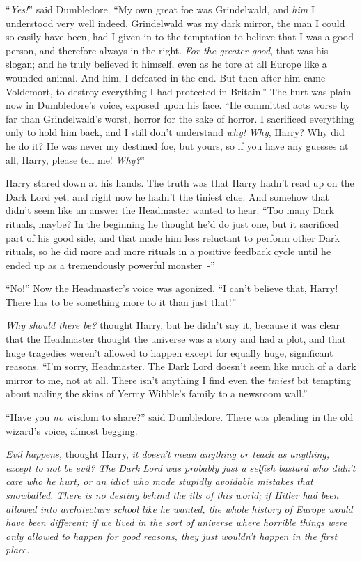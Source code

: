 ``\emph{Yes!}'' said Dumbledore. ``My own great foe was Grindelwald, and \emph{him} I understood very well indeed. Grindelwald was my dark mirror, the man I could so easily have been, had I given in to the temptation to believe that I was a good person, and therefore always in the right. \emph{For the greater good}, that was his slogan; and he truly believed it himself, even as he tore at all Europe like a wounded animal. And him, I defeated in the end. But then after him came Voldemort, to destroy everything I had protected in Britain.'' The hurt was plain now in Dumbledore's voice, exposed upon his face. ``He committed acts worse by far than Grindelwald's worst, horror for the sake of horror. I sacrificed everything only to hold him back, and I still don't understand \emph{why!} \emph{Why}, Harry? Why did he do it? He was never my destined foe, but yours, so if you have any guesses at all, Harry, please tell me! \emph{Why?}''

Harry stared down at his hands. The truth was that Harry hadn't read up on the Dark Lord yet, and right now he hadn't the tiniest clue. And somehow that didn't seem like an answer the Headmaster wanted to hear. ``Too many Dark rituals, maybe? In the beginning he thought he'd do just one, but it sacrificed part of his good side, and that made him less reluctant to perform other Dark rituals, so he did more and more rituals in a positive feedback cycle until he ended up as a tremendously powerful monster~-''

``No!'' Now the Headmaster's voice was agonized. ``I can't believe that, Harry! There has to be something more to it than just that!''

\emph{Why should there be?} thought Harry, but he didn't say it, because it was clear that the Headmaster thought the universe was a story and had a plot, and that huge tragedies weren't allowed to happen except for equally huge, significant reasons. ``I'm sorry, Headmaster. The Dark Lord doesn't seem like much of a dark mirror to me, not at all. There isn't anything I find even the \emph{tiniest} bit tempting about nailing the skins of Yermy Wibble's family to a newsroom wall.''

``Have you \emph{no} wisdom to share?'' said Dumbledore. There was pleading in the old wizard's voice, almost begging.

\emph{Evil happens,} thought Harry, \emph{it doesn't mean anything or teach us anything, except to not be evil? The Dark Lord was probably just a selfish bastard who didn't care who he hurt, or an idiot who made stupidly avoidable mistakes that snowballed. There is no destiny behind the ills of this world; if Hitler had been allowed into architecture school like he wanted, the whole history of Europe would have been different; if we lived in the sort of universe where horrible things were only allowed to happen for good reasons, they just wouldn't happen in the first place.}

